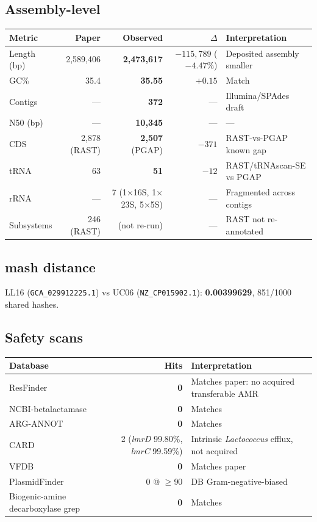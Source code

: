 \documentclass[11pt,a4paper]{article}
\begin{document}
\subsection{Assembly-level}
\begin{longtable}{@{}p{4cm}rrrp{5cm}@{}}
\toprule
Metric & Paper & Observed & $\Delta$ & Interpretation \\
\midrule
Length (bp) & 2{,}589{,}406 & \textbf{2{,}473{,}617} & $-115{,}789$ ($-4.47\%$) & Deposited assembly smaller \\
GC\% & 35.4 & \textbf{35.55} & $+0.15$ & Match \\
Contigs & --- & \textbf{372} & --- & Illumina/SPAdes draft \\
N50 (bp) & --- & \textbf{10{,}345} & --- & --- \\
CDS & 2{,}878 (RAST) & \textbf{2{,}507} (PGAP) & $-371$ & RAST-vs-PGAP known gap \\
tRNA & 63 & \textbf{51} & $-12$ & RAST/tRNAscan-SE vs PGAP \\
rRNA & --- & 7 (1$\times$16S, 1$\times$23S, 5$\times$5S) & --- & Fragmented across contigs \\
Subsystems & 246 (RAST) & (not re-run) & --- & RAST not re-annotated \\
\bottomrule
\end{longtable}

\subsection{mash distance}
LL16 (\texttt{GCA\_029912225.1}) vs UC06 (\texttt{NZ\_CP015902.1}): \textbf{0.00399629}, 851/1000 shared hashes.

\subsection{Safety scans}
\begin{tabular}{@{}lrp{6cm}@{}}
\toprule
Database & Hits & Interpretation \\
\midrule
ResFinder & \textbf{0} & Matches paper: no acquired transferable AMR \\
NCBI-betalactamase & \textbf{0} & Matches \\
ARG-ANNOT & \textbf{0} & Matches \\
CARD & 2 (\textit{lmrD} 99.80\%, \textit{lmrC} 99.59\%) & Intrinsic \textit{Lactococcus} efflux, not acquired \\
VFDB & \textbf{0} & Matches paper \\
PlasmidFinder & 0 @ $\geq$90 & DB Gram-negative-biased \\
Biogenic-amine decarboxylase grep & \textbf{0} & Matches \\
\bottomrule
\end{tabular}
\end{document}
